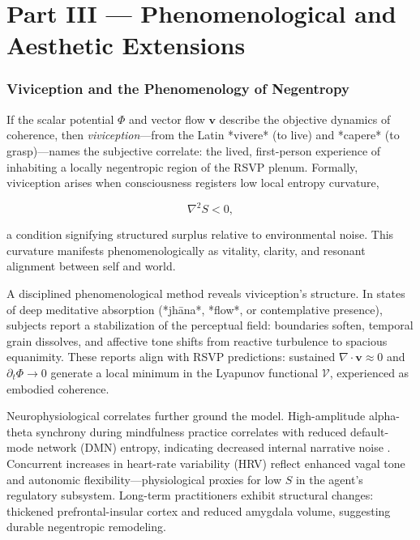 \documentclass[12pt,a4paper]{article}
\begin{document}
\clearpage
\part*{Part III — Phenomenological and Aesthetic Extensions}

\section{Viviception and the Phenomenology of Negentropy}

If the scalar potential $\Phi$ and vector flow $\bm{v}$ describe the objective dynamics of coherence, then \emph{viviception}—from the Latin *vivere* (to live) and *capere* (to grasp)—names the subjective correlate: the lived, first-person experience of inhabiting a locally negentropic region of the RSVP plenum. Formally, viviception arises when consciousness registers low local entropy curvature,

\begin{equation}
\nabla^2 S < 0,
\end{equation}

a condition signifying structured surplus relative to environmental noise. This curvature manifests phenomenologically as vitality, clarity, and resonant alignment between self and world.

A disciplined phenomenological method reveals viviception’s structure. In states of deep meditative absorption (*jhāna*, *flow*, or contemplative presence), subjects report a stabilization of the perceptual field: boundaries soften, temporal grain dissolves, and affective tone shifts from reactive turbulence to spacious equanimity. These reports align with RSVP predictions: sustained $\nabla\!\cdot\!\bm{v} \approx 0$ and $\partial_t \Phi \to 0$ generate a local minimum in the Lyapunov functional $\mathcal{V}$, experienced as embodied coherence.

Neurophysiological correlates further ground the model. High-amplitude alpha-theta synchrony during mindfulness practice correlates with reduced default-mode network (DMN) entropy, indicating decreased internal narrative noise \cite{lutz2008regulation}. Concurrent increases in heart-rate variability (HRV) reflect enhanced vagal tone and autonomic flexibility—physiological proxies for low $S$ in the agent’s regulatory subsystem. Long-term practitioners exhibit structural changes: thickened prefrontal-insular cortex and reduced amygdala volume, suggesting durable negentropic remodeling.
\end{document}
